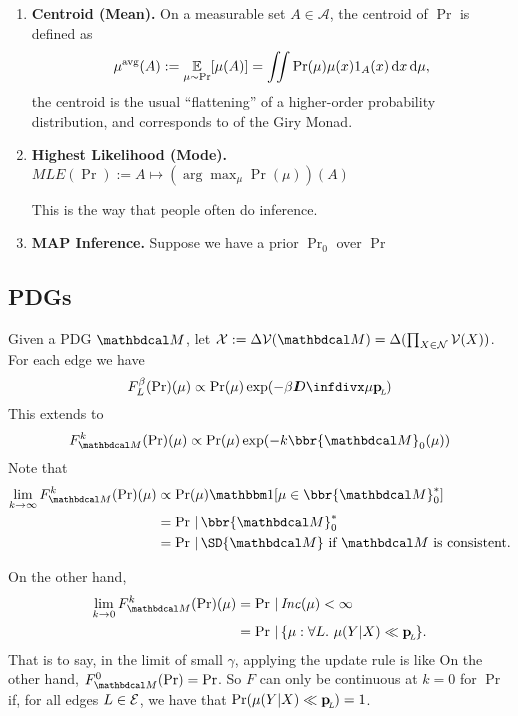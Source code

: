 \documentclass{article}
\begin{document}
\begin{enumerate}
    \item \textbf{Centroid (Mean).}
        On a measurable set $A \in \mathcal A$, the centroid of $\Pr$ is defined as
        \[
            \mu^{\text{avg}}(A) := \operatorname*{\mathbb{E}}_{\mu \sim \Pr}[ \mu(A)] =
                \iint \Pr(\mu) \mu(x) 1_{A}(x)\, \mathrm d x\,\mathrm d\mu,
        \]
        the centroid is the usual ``flattening'' of a higher-order probability distribution, and corresponds to
        of the Giry Monad.

    \item \textbf{Highest Likelihood (Mode).}
        $\textit{MLE}(\Pr) := A \mapsto (\arg\max_\mu \Pr(\mu))(A)$

        This is the way that people often do inference.

    \item \textbf{MAP Inference.}
        Suppose we have a prior $\Pr_0$ over  $\Pr$

\end{enumerate}


\subsection{PDGs}

Given a PDG $\dg M$, let $\X := \Delta\V(\dg M) = \Delta(\prod_{X\in\N}\V(X))$. For each edge we have
\[
    F_L^{\beta}(\Pr) (\mu) \propto \Pr(\mu) \exp(-\beta \kldiv\mu \bp)
\]
This extends to
\[
    F_{\dg M}^k(\Pr)(\mu) \propto \Pr(\mu) \exp(- k \bbr{\dg M}_0(\mu))
\]
Note that
\begin{align*}
    \lim_{k \to \infty} F_{\dg M}^k(\Pr)(\mu) &\propto
        \Pr(\mu) \mathbbm1[\mu \in {\bbr{\dg M}^*_0}] \\
        &= \Pr \,|\, \bbr{\dg M}^*_0 \\
        &= \Pr \,|\, \SD{\dg M} \text{~if $\dg M$ is consistent.}
\end{align*}

On the other hand,
\begin{align*}
    \lim_{k \to 0} F_{\dg M}^k(\Pr)(\mu) &= \Pr \,|\, \Inc(\mu) < \infty \\
        &= \Pr \,|\, \{\mu : \forall L.~\mu(Y|X) \ll \bp \}.
\end{align*}
That is to say, in the limit of small $\gamma$, applying the update rule is like
On the other hand, $F_{\dg M}^0(\Pr) = \Pr$. So $F$ can only be continuous at $k=0$ for $\Pr$ if, for all edges $L \in \mathcal E$, we have that $\Pr(\mu(Y|X) \ll \mathbf{p}_{\!_{L}\!}) = 1$.
\end{document}
